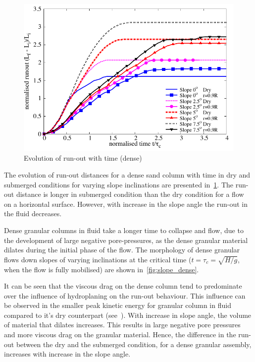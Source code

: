 \documentclass[12pt,a4paper,twocolumn,fleqn]{NARMS}
\begin{document}
\begin{figure}
\centering
\includegraphics[width=0.97\columnwidth]{figs/Runout_dense.pdf}
\caption{Evolution of run-out with time (dense)}
\label{fig:run_dense}
\end{figure}

The evolution of run-out distances for a dense sand column with time in dry and submerged conditions for varying slope inclinations are presented in~\cref{fig:run_dense}. The run-out distance is longer in submerged condition than the dry condition for a flow on a horizontal surface. However, with increase in the slope angle the run-out in the fluid decreases.

Dense granular columns in fluid take a longer time to collapse and flow, due to the development of large negative pore-pressures, as the dense granular material dilates during the initial phase of the flow. The morphology of dense granular flows down slopes of varying inclinations at the critical time ($t=\tau_{c}=\sqrt{H/g}$, when the flow is fully mobilised) are shown in~\cref{fig:slope_dense}.

It can be seen that the viscous drag on the dense column tend to predominate over the influence of hydroplaning on the run-out behaviour. This influence can be observed in the smaller peak kinetic energy for granular column in fluid compared to it's dry counterpart (see~). With increase in slope angle, the volume of material that dilates increases. This results in large negative pore pressures and more viscous drag on the granular material. Hence, the difference in the run-out between the dry and the submerged condition, for a dense granular assembly, increases with increase in the slope angle.
\end{document}
